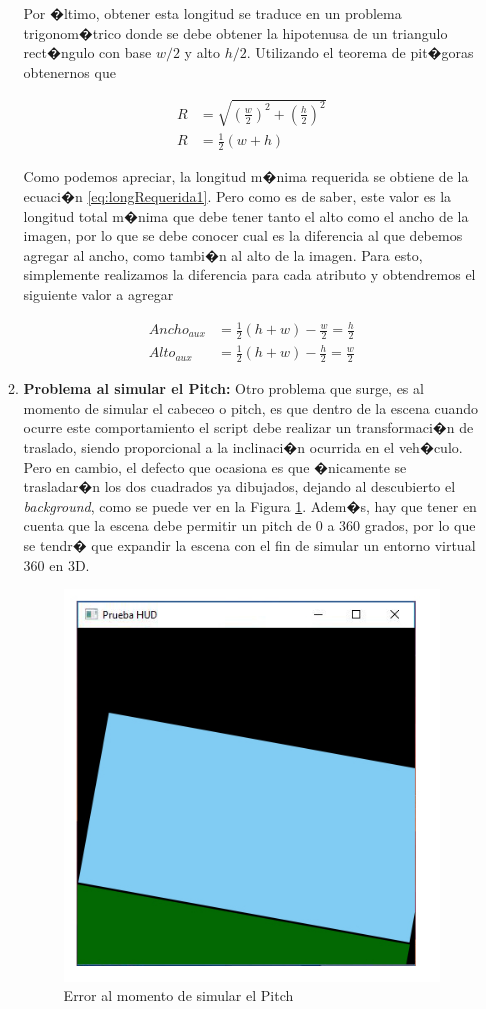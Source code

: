 \begin{enumerate}
\begin{enumerate}
		\par Por �ltimo, obtener esta longitud se traduce en un problema trigonom�trico  donde se debe obtener la hipotenusa de un triangulo rect�ngulo con base $w/2$ y alto $h/2$. Utilizando el teorema de pit�goras obtenernos que
		
		
		\begin{subequations}\label{eq:longRequerida}
			\begin{align}
			R &= \sqrt{(\frac{w}{2})^2 + (\frac{h}{2})^2}  \\
			R &= \frac{1}{2} (w + h) \label{eq:longRequerida1}
			\end{align}
		\end{subequations}
		
		Como podemos apreciar, la longitud m�nima requerida se obtiene de la ecuaci�n \ref{eq:longRequerida1}. Pero como es de saber, este valor es la longitud total m�nima que debe tener tanto el alto como el ancho de la imagen, por lo que se debe conocer cual es la diferencia al que debemos agregar al ancho, como tambi�n al alto de la imagen. Para esto, simplemente realizamos la diferencia para cada atributo y obtendremos el siguiente valor a agregar
		
		
		\begin{subequations}
			\begin{align}
			Ancho_{aux} &= \frac{1}{2} (h+w) - \frac{w}{2} =  \frac{h}{2} \\
			Alto_{aux} &=  \frac{1}{2} (h+w)  - \frac{h}{2} =  \frac{w}{2} 
			\end{align}
			
		\end{subequations}
		
		\item \textbf{Problema al simular el Pitch: } Otro problema que surge, es al momento de simular el cabeceo o pitch, es que dentro de la escena cuando ocurre este comportamiento el script debe realizar un transformaci�n de traslado, siendo proporcional a la inclinaci�n ocurrida en el veh�culo. Pero en cambio, el defecto que ocasiona es que �nicamente se trasladar�n los dos cuadrados ya dibujados, dejando al descubierto el \textit{background}, como se puede ver en la Figura \ref{fig:hudv0e2}. Adem�s, hay que tener en cuenta que la escena debe permitir un pitch de 0 a 360 grados, por lo que se tendr� que expandir la escena con el fin de simular un entorno virtual 360 en 3D.
		
		\begin{figure}[h!]
			\centering
			\includegraphics[width=0.3\linewidth, height=0.3\linewidth]{Imagenes/HUD_v0_e2}
			\caption{Error al momento de simular el Pitch}
			\label{fig:hudv0e2}
		\end{figure}
		

\end{enumerate}
\end{enumerate}
